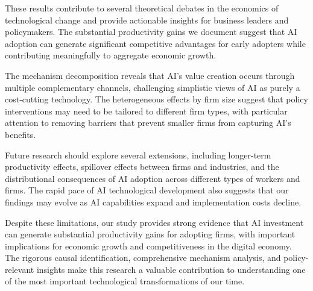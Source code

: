 \documentclass[12pt]{article}
\begin{document}
These results contribute to several theoretical debates in the economics of technological change and provide actionable insights for business leaders and policymakers. The substantial productivity gains we document suggest that AI adoption can generate significant competitive advantages for early adopters while contributing meaningfully to aggregate economic growth.

The mechanism decomposition reveals that AI's value creation occurs through multiple complementary channels, challenging simplistic views of AI as purely a cost-cutting technology. The heterogeneous effects by firm size suggest that policy interventions may need to be tailored to different firm types, with particular attention to removing barriers that prevent smaller firms from capturing AI's benefits.

Future research should explore several extensions, including longer-term productivity effects, spillover effects between firms and industries, and the distributional consequences of AI adoption across different types of workers and firms. The rapid pace of AI technological development also suggests that our findings may evolve as AI capabilities expand and implementation costs decline.

Despite these limitations, our study provides strong evidence that AI investment can generate substantial productivity gains for adopting firms, with important implications for economic growth and competitiveness in the digital economy. The rigorous causal identification, comprehensive mechanism analysis, and policy-relevant insights make this research a valuable contribution to understanding one of the most important technological transformations of our time.

\newpage
\end{document}
